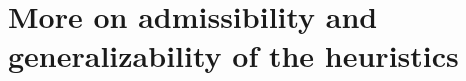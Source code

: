 \documentclass[11pt]{article}
\begin{document}
{















\appendix




































\section{More on admissibility and generalizability of the heuristics}\label{more-on}

}
\end{document}
